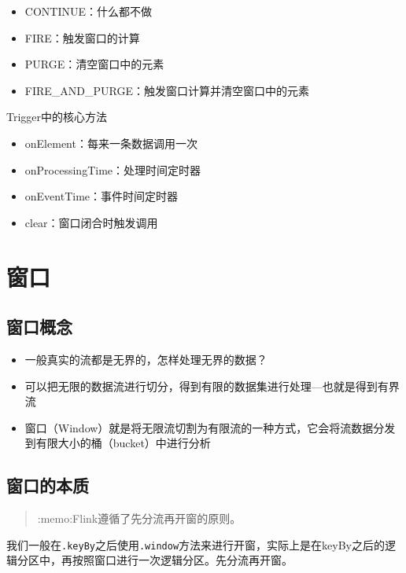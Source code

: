 \begin{itemize}
\tightlist
\item
  CONTINUE：什么都不做
\item
  FIRE：触发窗口的计算
\item
  PURGE：清空窗口中的元素
\item
  FIRE\_AND\_PURGE：触发窗口计算并清空窗口中的元素
\end{itemize}

Trigger中的核心方法

\begin{itemize}
\tightlist
\item
  onElement：每来一条数据调用一次
\item
  onProcessingTime：处理时间定时器
\item
  onEventTime：事件时间定时器
\item
  clear：窗口闭合时触发调用
\end{itemize}

\hypertarget{ux7a97ux53e3}{%
\section{窗口}\label{ux7a97ux53e3}}

\hypertarget{ux7a97ux53e3ux6982ux5ff5}{%
\subsection{窗口概念}\label{ux7a97ux53e3ux6982ux5ff5}}

\begin{itemize}
\tightlist
\item
  一般真实的流都是无界的，怎样处理无界的数据？
\item
  可以把无限的数据流进行切分，得到有限的数据集进行处理---也就是得到有界流
\item
  窗口（Window）就是将无限流切割为有限流的一种方式，它会将流数据分发到有限大小的桶（bucket）中进行分析
\end{itemize}

\hypertarget{ux7a97ux53e3ux7684ux672cux8d28}{%
\subsection{窗口的本质}\label{ux7a97ux53e3ux7684ux672cux8d28}}

\begin{quote}
:memo:Flink遵循了{先分流再开窗}的原则。
\end{quote}

我们一般在\texttt{.keyBy}之后使用\texttt{.window}方法来进行开窗，实际上是在keyBy之后的逻辑分区中，再按照窗口进行一次逻辑分区。先分流再开窗。

